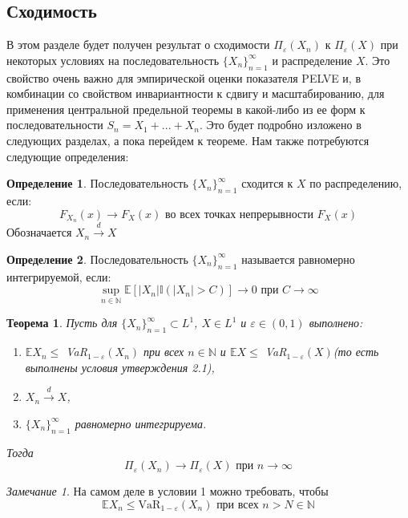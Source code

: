 \documentclass[12pt]{article}
\theoremstyle{plain}
\newtheorem{theorem}{Теорема}[section]
\theoremstyle{definition}
\newtheorem{definition}{Определение}[section]
\theoremstyle{remark}
\newtheorem{remark}{Замечание}[section]
\begin{document}
\subsection{Сходимость}
В этом разделе будет получен результат о сходимости $\Pi_\varepsilon(X_n)$ к $\Pi_\varepsilon(X)$ при некоторых условиях на последовательность $\{X_n\}_{n=1}^\infty$ и распределение $X$. Это свойство очень важно для эмпирической оценки показателя PELVE и, в комбинации со свойством инвариантности к сдвигу и масштабированию, для применения центральной предельной теоремы в какой-либо из ее форм к последовательности $S_n=X_1+...+X_n$. Это будет подробно изложено в следующих разделах, а пока перейдем к теореме. Нам также потребуются следующие определения:

\begin{definition}
    Последовательность $\{X_n\}_{n=1}^\infty$ сходится к $X$ по распределению, если:
    \[
        F_{X_n}(x) \to F_X(x) \text{ во всех точках непрерывности } F_X(x)
    \]
    Обозначается $X_n \overset{d}{\to}X$
\end{definition}

\begin{definition}
    Последовательность $\{X_n\}_{n=1}^\infty$ называется равномерно интегрируемой, если:
    \[
        \sup_{n \in \mathbb{N}}\mathbb{E}[|X_n|\mathbb{I}(|X_n| > C)] \to 0 \text{ при } C  \to \infty
    \]
\end{definition}

\begin{theorem}
    Пусть для $\{X_n\}_{n=1}^{\infty} \subset L^1$, $X \in L^1$ и $\varepsilon \in (0, 1)$ выполнено:
    \begin{enumerate}
        \item $\mathbb{E}X_n \leq $ VaR$_{1-\varepsilon}(X_n)$ при всех $n \in \mathbb{N}$ и $\mathbb{E}X \leq $ VaR$_{1-\varepsilon}(X)$(то есть выполнены условия утверждения 2.1),
        \item $X_n\overset{d}{\to}X$,
        \item $\{X_n\}_{n=1}^{\infty}$ равномерно интегрируема.
    \end{enumerate}

    Тогда 
    \[
        \Pi_\varepsilon(X_n) \to \Pi_\varepsilon(X) \text{ при } n\to\infty
    \]
\end{theorem}

\begin{remark}
    На самом деле в условии 1 можно требовать, чтобы 
    \[
        \mathbb{E}X_n \leq \text{VaR}_{1-\varepsilon}(X_n) \text{ при всех } n > N \in \mathbb{N}
    \]
\end{remark}
\end{document}
